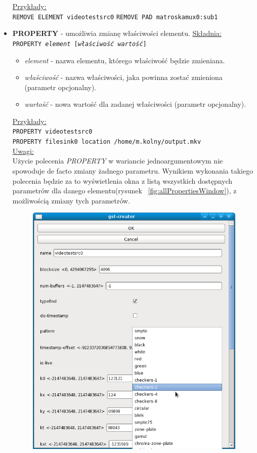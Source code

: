 \documentclass[12pt]{article}
\begin{document}
\begin{itemize}
\underline{Przykłady:} \\
\texttt{REMOVE ELEMENT videotestsrc0}
\texttt{REMOVE PAD matroskamux0:sub1}
\item \textbf{PROPERTY} - umożliwia zmianę właściwości elementu.
\underline{Składnia:} \\
\texttt{PROPERTY \textit{element} [\textit{właściwość} \textit{wartość}]}
\begin{itemize}
\item \textit{element} - nazwa elementu, którego właściwość będzie zmieniana.
\item \textit{właściwość} - nazwa właściwości, jaka powinna zostać zmieniona (parametr opcjonalny).
\item \textit{wartość} - nowa wartość dla zadanej właściwości (parametr opcjonalny). 
\end{itemize}
\underline{Przykłady:} \\
\texttt{PROPERTY videotestsrc0} \\
\texttt{PROPERTY filesink0 location /home/m.kolny/output.mkv} \\
\underline{Uwagi:} \\
Użycie polecenia \textit{PROPERTY} w wariancie jednoargumentowym nie spowoduje de facto zmiany żadnego parametru. Wynikiem wykonania takiego polecenia będzie za to wyświetlenia okna z listą wszystkich dostępnych parametrów dla danego elementu(rysunek ~\ref{fig:allPropertiesWindow}), z możliwością zmiany tych parametrów.
\begin{figure}[H]
  \includegraphics[width=150mm]{img/all-properties-window.png}

\end{figure}
\end{itemize}
\end{document}
